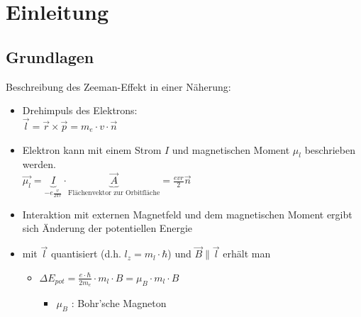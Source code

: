 
\section{Einleitung}


    \subsection{Grundlagen}
        \begin{myframe}{\subsecname}
            Beschreibung des Zeeman-Effekt in einer Näherung:
            \begin{itemize}
                \item Drehimpuls des Elektrons: \\ $\vec{l} = \vec{r} \times \vec{p} = m_e \cdot v \cdot \vec{n}$
                \item Elektron kann mit einem Strom $ I $ und magnetischen Moment $\mu_{l}$ beschrieben werden. \\
                    $\vec{\mu_{l}} = \underbrace{I}_{- e \frac{v}{2 \pi r}} \cdot \underbrace{\vec{A}}_{\text{Flächenvektor zur Orbitfläche}} = \frac{evr}{2} \vec{n}$
                \item Interaktion mit externen Magnetfeld und dem magnetischen Moment ergibt sich Änderung der potentiellen Energie
                \item mit $\vec{l}$ quantisiert (d.h. $l_z = m_l \cdot \hbar$) und $\vec{B} \parallel \vec{l}$ erhält man
                \begin{itemize}
                    \item[] $\Delta E_{pot} = \frac{e \cdot \hbar}{2m_e} \cdot m_l \cdot B = \mu_B \cdot m_l \cdot B $
                    \begin{itemize}
                        \item[] $\mu_{B}$ : Bohr'sche Magneton
                    \end{itemize}
                \end{itemize}
            \end{itemize}
        \end{myframe}

